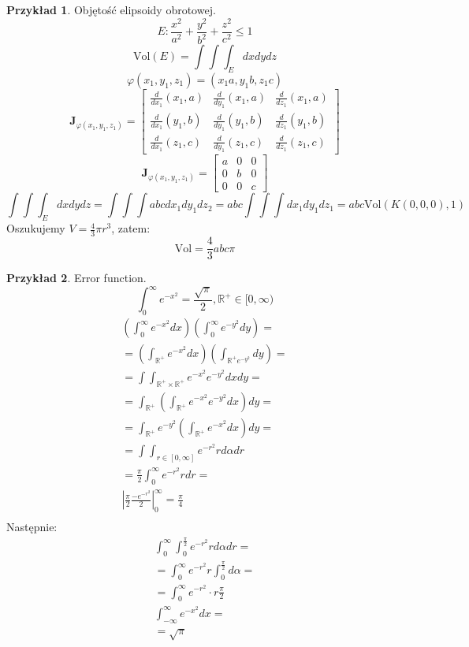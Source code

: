 \documentclass{article}
\theoremstyle{definition}
\theoremstyle{definition}
\theoremstyle{definition}
\newtheorem{pk}{Przykład}[subsection]
\theoremstyle{definition}
\begin{document}
\begin{pk}
    Objętość elipsoidy obrotowej.
    \[E: \frac{x^2}{a^2} + \frac{y^2}{b^2} + \frac{z^2}{c^2} \leq 1\]
    \[\text{Vol}(E) = \int\int\int_{E} dx dy dz\]
    \[\varphi(x_1,y_1,z_1) = (x_1 a, y_1 b, z_1 c)\]
    \[\mathbf{J}_{\varphi(x_1,y_1,z_1)} = \begin{bmatrix}\frac{d}{dx_1}(x_1,a) & \frac{d}{dy_1}(x_1,a) & \frac{d}{dz_1}(x_1,a)\\ \frac{d}{dx_1}(y_1,b) & \frac{d}{dy_1}(y_1,b) & \frac{d}{dz_1}(y_1,b)\\ \frac{d}{dx_1}(z_1,c) & \frac{d}{dy_1}(z_1,c) & \frac{d}{dz_1}(z_1,c)\end{bmatrix}\]
    \[\mathbf{J}_{\varphi(x_1,y_1,z_1)} = \begin{bmatrix}a & 0 & 0\\0 & b & 0\\0 & 0 & c\end{bmatrix}\]
    \[\int\int\int_{E} dx dy dz = \int\int\int abc dx_1 dy_1 dz_2 = abc \int\int\int dx_1dy_1dz_1= abc \text{Vol}\left(K(0,0,0),1\right)\]
    Oszukujemy $V=\frac{4}{3}\pi r^3$, zatem:
    \[\text{Vol}=\frac{4}{3}abc \pi\]
\end{pk}

\begin{pk}
    Error function. 
    \[\int_{0}^{\infty} e^{-x^2} = \frac{\sqrt{\pi}}{2}, \mathbb{R}^{+} \in [0,\infty)\]
    \begin{align}
        \left(\int_{0}^{\infty} e^{-x^2} dx\right)\left(\int_{0}^{\infty} e^{-y^2} dy\right)=\\
        =\left(\int_{\mathbb{R}^{+}} e^{-x^2} dx\right)\left(\int_{\mathbb{R}^{+} e^{-y^2}} dy\right)=\\
        =\int\int_{\mathbb{R}^{+}\times\mathbb{R}^{+}} e^{-x^2} e^{-y^2} dxdy=\\
        =\int_{\mathbb{R}^{+}} \left(\int_{\mathbb{R}^{+}} e^{-x^2} e^{-y^2} dx\right) dy=\\
        =\int_{\mathbb{R}^{+}} e^{-y^2} \left(\int_{\mathbb{R}^{+}} e^{-x^2} dx\right) dy=\\
        =\int\int_{r\in[0,\infty]} e^{-r^2} r d\alpha dr\\
        = \frac{\pi}{2} \int_{0}^{\infty} e^{-r^2} r dr=\\
        \left|\frac{\pi}{2} \frac{-e^{-r^2}}{2} \right|_{0}^{\infty} = \frac{\pi}{4}\\
    \end{align}
    Następnie:
    \begin{align}
        \int_{0}^{\infty} \int_{0}^{\frac{\pi}{2}} e^{-r^2} r d\alpha dr=\\
        =\int_{0}^{\infty} e^{-r^2} r \int_{0}^{\frac{\pi}{2}} d\alpha =\\
        =\int_{0}^{\infty} e^{-r^2} \cdot r \frac{\pi}{2}\\
        \int_{-\infty}^{\infty} e^{-x^2} dx =\\
        =\sqrt{\pi}
    \end{align}
\end{pk}
\end{document}
